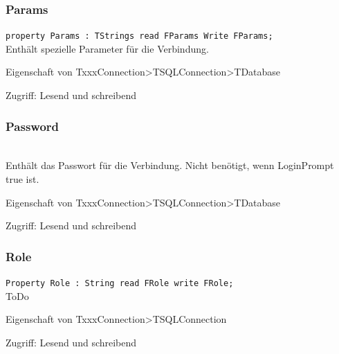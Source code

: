 \subsubsection{Params}
\begin{description}
  \item \texttt{property Params : TStrings read FParams Write FParams;}\\Enthält spezielle Parameter für die Verbindung.
  \begin{description}
    \item Eigenschaft von TxxxConnection>TSQLConnection>TDatabase
  \end{description}
  \begin{description}
    \item Zugriff: Lesend und schreibend
  \end{description}
\end{description}

\subsubsection{Password}
\begin{description}
  \item \texttt{}\\Enthält das Passwort für die Verbindung. Nicht benötigt, wenn LoginPrompt true ist.
  \begin{description}
    \item Eigenschaft von TxxxConnection>TSQLConnection>TDatabase
  \end{description}
  \begin{description}
    \item Zugriff: Lesend und schreibend
  \end{description}
\end{description}

\subsubsection{Role}
\begin{description}
  \item \texttt{Property Role :  String read FRole write FRole;}\\ToDo
  \begin{description}
    \item Eigenschaft von TxxxConnection>TSQLConnection
  \end{description}
  \begin{description}
    \item Zugriff: Lesend und schreibend
  \end{description}
\end{description}

